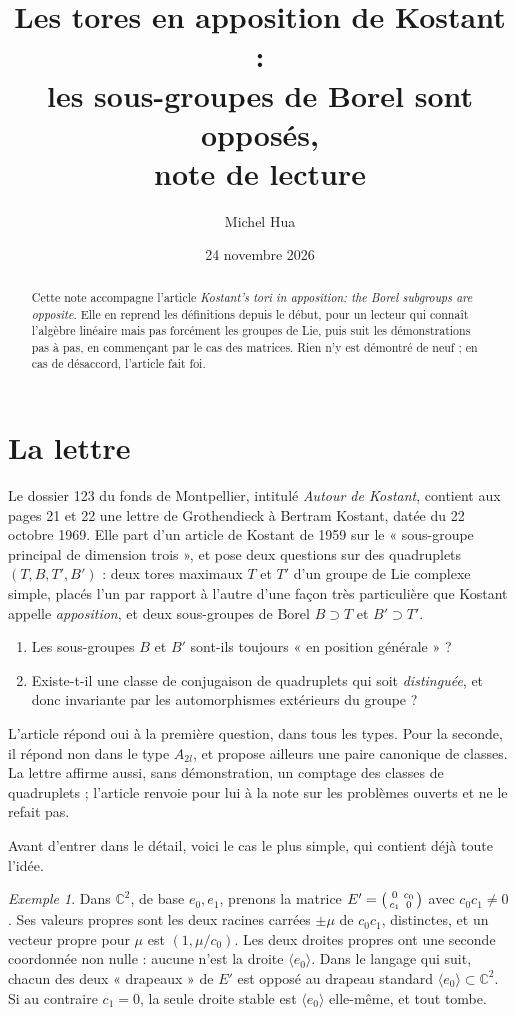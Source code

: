 \documentclass[11pt,a4paper]{amsart}
\title[Note de lecture : les tores en apposition de Kostant]{Les tores en apposition de Kostant :\\ les sous-groupes de Borel sont opposés,\\ note de lecture}
\author{Michel Hua}
\date{24 novembre 2026}
\theoremstyle{definition}
\theoremstyle{plain}
\theoremstyle{remark}
\newtheorem{exemple}{Exemple}
\newcommand{\C}{\mathbb C}
\begin{document}
\maketitle

\begin{abstract}
Cette note accompagne l'article \emph{Kostant's tori in apposition: the Borel subgroups are opposite}. Elle en reprend les définitions depuis le début, pour un lecteur qui connaît l'algèbre linéaire mais pas forcément les groupes de Lie, puis suit les démonstrations pas à pas, en commençant par le cas des matrices. Rien n'y est démontré de neuf ; en cas de désaccord, l'article fait foi.
\end{abstract}

\section{La lettre}

Le dossier 123 du fonds de Montpellier, intitulé \emph{Autour de Kostant}, contient aux pages 21 et 22 une lettre de Grothendieck à Bertram Kostant, datée du 22 octobre 1969. Elle part d'un article de Kostant de 1959 sur le « sous-groupe principal de dimension trois », et pose deux questions sur des quadruplets $(T, B, T', B')$ : deux tores maximaux $T$ et $T'$ d'un groupe de Lie complexe simple, placés l'un par rapport à l'autre d'une façon très particulière que Kostant appelle \emph{apposition}, et deux sous-groupes de Borel $B \supset T$ et $B' \supset T'$.
\begin{enumerate}
\item Les sous-groupes $B$ et $B'$ sont-ils toujours « en position générale » ?
\item Existe-t-il une classe de conjugaison de quadruplets qui soit \emph{distinguée}, et donc invariante par les automorphismes extérieurs du groupe ?
\end{enumerate}
L'article répond oui à la première question, dans tous les types. Pour la seconde, il répond non dans le type $A_{2l}$, et propose ailleurs une paire canonique de classes. La lettre affirme aussi, sans démonstration, un comptage des classes de quadruplets ; l'article renvoie pour lui à la note sur les problèmes ouverts et ne le refait pas.

Avant d'entrer dans le détail, voici le cas le plus simple, qui contient déjà toute l'idée.

\begin{exemple}\label{ex:deux}
Dans $\C^2$, de base $e_0, e_1$, prenons la matrice $E' = \begin{psmallmatrix} 0 & c_0 \\ c_1 & 0 \end{psmallmatrix}$ avec $c_0 c_1 \neq 0$. Ses valeurs propres sont les deux racines carrées $\pm\mu$ de $c_0c_1$, distinctes, et un vecteur propre pour $\mu$ est $(1, \mu/c_0)$. Les deux droites propres ont une seconde coordonnée non nulle : aucune n'est la droite $\langle e_0\rangle$. Dans le langage qui suit, chacun des deux « drapeaux » de $E'$ est opposé au drapeau standard $\langle e_0 \rangle \subset \C^2$. Si au contraire $c_1 = 0$, la seule droite stable est $\langle e_0 \rangle$ elle-même, et tout tombe.
\end{exemple}
\end{document}
